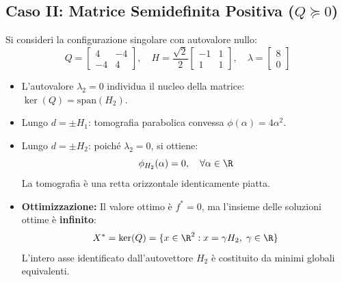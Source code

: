 \subsection{Caso II: Matrice Semidefinita Positiva (\texorpdfstring{$Q \succeq 0$}{Q >= 0})}
Si consideri la configurazione singolare con autovalore nullo:
\begin{equation}
Q = \begin{bmatrix} 4 & -4 \\ -4 & 4 \end{bmatrix}, \quad H = \frac{\sqrt{2}}{2} \begin{bmatrix} -1 & 1 \\ 1 & 1 \end{bmatrix}, \quad \lambda = \begin{bmatrix} 8 \\ 0 \end{bmatrix}
\end{equation}
\begin{itemize}
    \item L'autovalore $\lambda_2 = 0$ individua il nucleo della matrice: $\ker(Q) = \text{span}(H_2)$.
    \item Lungo $d = \pm H_1$: tomografia parabolica convessa $\phi(\alpha) = 4\alpha^2$.
    \item Lungo $d = \pm H_2$: poich\'e $\lambda_2 = 0$, si ottiene:
    \begin{equation}
    \phi_{H_2}(\alpha) = 0, \quad \forall \alpha \in \R
    \end{equation}
    La tomografia \`e una retta orizzontale identicamente piatta.
    \item \textbf{Ottimizzazione:} Il valore ottimo \`e $f^* = 0$, ma l'insieme delle soluzioni ottime \`e \textbf{infinito}:
    \begin{equation}
    X^* = \ker(Q) = \{x \in \R^2 : x = \gamma H_2, \; \gamma \in \R\}
    \end{equation}
    L'intero asse identificato dall'autovettore $H_2$ \`e costituito da minimi globali equivalenti.
\end{itemize}

